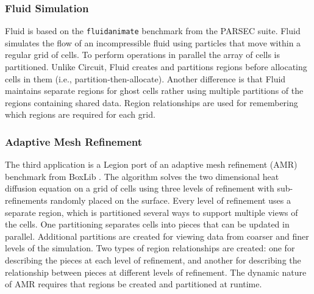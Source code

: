 \subsubsection{Fluid Simulation}
\label{subsec:fluid}
Fluid is based on the {\tt fluidanimate} benchmark from the PARSEC 
suite\cite{bienia11benchmarking}.  Fluid simulates the flow of an incompressible fluid
using particles that move within a regular grid of cells.  To perform operations in 
parallel the array of cells is partitioned.  Unlike
Circuit, Fluid creates and partitions regions before
allocating cells in them (i.e., partition-then-allocate).  Another difference is that Fluid
maintains separate regions for ghost cells rather using multiple partitions of
the regions containing shared data.  Region relationships are used for remembering
which regions are required for each grid.

\subsubsection{Adaptive Mesh Refinement}
\label{subsec:amr}
The third application is a Legion port of an adaptive mesh refinement (AMR) benchmark 
from BoxLib \cite{BoxLib}.  The algorithm solves the two
dimensional heat diffusion equation on a grid of cells using three levels of refinement with sub-refinements
randomly placed on the surface.  
Every level of refinement uses a separate region, which is partitioned several ways to support multiple views of
the cells.  One partitioning separates cells into pieces that can be updated in
parallel.  Additional partitions are created for viewing data from coarser and finer levels of
the simulation.  Two types of region relationships are created: one for describing the pieces at 
each level of refinement, and another for describing the relationship between pieces at different
levels of refinement.  
The dynamic nature of AMR requires that regions be created and partitioned at runtime.  

